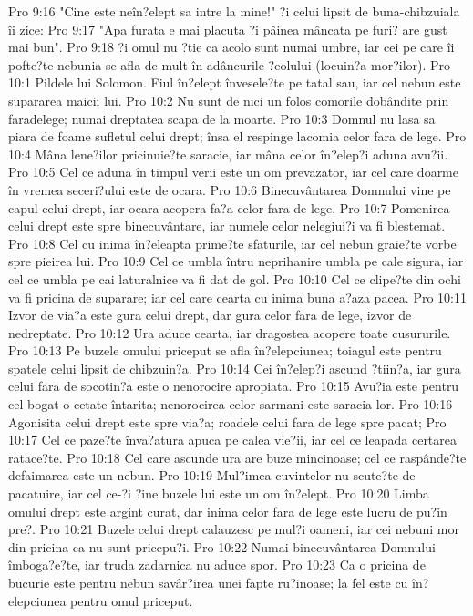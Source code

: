 Pro 9:16  "Cine este neîn?elept sa intre la mine!" ?i celui lipsit de buna-chibzuiala îi zice:
Pro 9:17  "Apa furata e mai placuta ?i pâinea mâncata pe furi? are gust mai bun".
Pro 9:18  ?i omul nu ?tie ca acolo sunt numai umbre, iar cei pe care îi pofte?te nebunia se afla de mult în adâncurile ?eolului (locuin?a mor?ilor).
Pro 10:1  Pildele lui Solomon. Fiul în?elept învesele?te pe tatal sau, iar cel nebun este supararea maicii lui.
Pro 10:2  Nu sunt de nici un folos comorile dobândite prin faradelege; numai dreptatea scapa de la moarte.
Pro 10:3  Domnul nu lasa sa piara de foame sufletul celui drept; însa el respinge lacomia celor fara de lege.
Pro 10:4  Mâna lene?ilor pricinuie?te saracie, iar mâna celor în?elep?i aduna avu?ii.
Pro 10:5  Cel ce aduna în timpul verii este un om prevazator, iar cel care doarme în vremea seceri?ului este de ocara.
Pro 10:6  Binecuvântarea Domnului vine pe capul celui drept, iar ocara acopera fa?a celor fara de lege.
Pro 10:7  Pomenirea celui drept este spre binecuvântare, iar numele celor nelegiui?i va fi blestemat.
Pro 10:8  Cel cu inima în?eleapta prime?te sfaturile, iar cel nebun graie?te vorbe spre pieirea lui.
Pro 10:9  Cel ce umbla întru neprihanire umbla pe cale sigura, iar cel ce umbla pe cai laturalnice va fi dat de gol.
Pro 10:10  Cel ce clipe?te din ochi va fi pricina de suparare; iar cel care cearta cu inima buna a?aza pacea.
Pro 10:11  Izvor de via?a este gura celui drept, dar gura celor fara de lege, izvor de nedreptate.
Pro 10:12  Ura aduce cearta, iar dragostea acopere toate cusururile.
Pro 10:13  Pe buzele omului priceput se afla în?elepciunea; toiagul este pentru spatele celui lipsit de chibzuin?a.
Pro 10:14  Cei în?elep?i ascund ?tiin?a, iar gura celui fara de socotin?a este o nenorocire apropiata.
Pro 10:15  Avu?ia este pentru cel bogat o cetate întarita; nenorocirea celor sarmani este saracia lor.
Pro 10:16  Agonisita celui drept este spre via?a; roadele celui fara de lege spre pacat;
Pro 10:17  Cel ce paze?te înva?atura apuca pe calea vie?ii, iar cel ce leapada certarea ratace?te.
Pro 10:18  Cel care ascunde ura are buze mincinoase; cel ce raspânde?te defaimarea este un nebun.
Pro 10:19  Mul?imea cuvintelor nu scute?te de pacatuire, iar cel ce-?i ?ine buzele lui este un om în?elept.
Pro 10:20  Limba omului drept este argint curat, dar inima celor fara de lege este lucru de pu?in pre?.
Pro 10:21  Buzele celui drept calauzesc pe mul?i oameni, iar cei nebuni mor din pricina ca nu sunt pricepu?i.
Pro 10:22  Numai binecuvântarea Domnului îmboga?e?te, iar truda zadarnica nu aduce spor.
Pro 10:23  Ca o pricina de bucurie este pentru nebun savâr?irea unei fapte ru?inoase; la fel este cu în?elepciunea pentru omul priceput.

